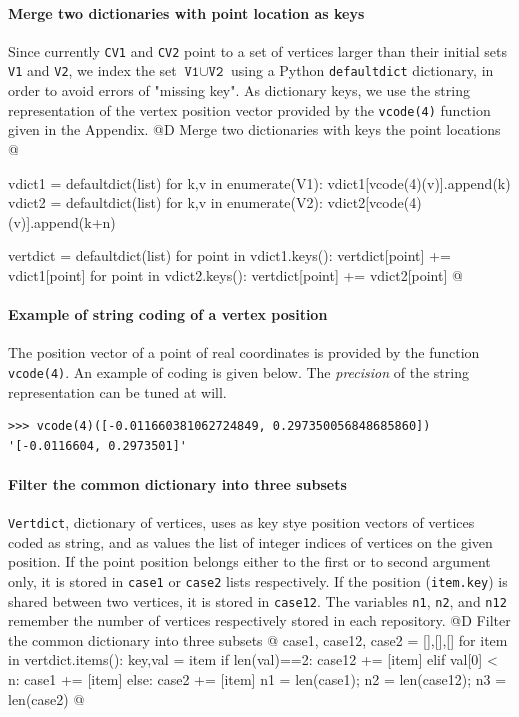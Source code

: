 \documentclass[11pt,oneside]{article}	%
\begin{document}
\paragraph{Merge two dictionaries with point location as keys}
Since currently \texttt{CV1} and \texttt{CV2} point to a set of vertices larger than their initial sets 
\texttt{V1} and \texttt{V2}, we index the set $\texttt{V1} \cup \texttt{V2}$ using a Python \texttt{defaultdict} dictionary, in order to avoid errors of "missing key". As dictionary keys, we use the string representation of the vertex position vector provided by the \texttt{vcode(4)} function given in the Appendix.
@D Merge two dictionaries with keys the point locations
@{
	vdict1 = defaultdict(list)
	for k,v in enumerate(V1): vdict1[vcode(4)(v)].append(k) 
	vdict2 = defaultdict(list)
	for k,v in enumerate(V2): vdict2[vcode(4)(v)].append(k+n) 
	
	vertdict = defaultdict(list)
	for point in vdict1.keys(): vertdict[point] += vdict1[point]
	for point in vdict2.keys(): vertdict[point] += vdict2[point]
@}

\paragraph{Example of string coding of a vertex position}
The position vector of a point of real coordinates is provided by the function \texttt{vcode(4)}.
An example of coding is given below. The \emph{precision} of the string representation can be tuned at will.
{\small
\begin{verbatim}
>>> vcode(4)([-0.011660381062724849, 0.297350056848685860])
'[-0.0116604, 0.2973501]'
\end{verbatim}}



\paragraph{Filter the common dictionary into three subsets}
\texttt{Vertdict}, dictionary of vertices, uses as key stye position vectors of vertices coded as string, and as values the list of integer indices of vertices on the given position. If the point position belongs either to the first or to second argument only, it is stored in \texttt{case1} or \texttt{case2} lists respectively. If the position (\texttt{item.key}) is shared between two vertices, it is stored in \texttt{case12}.
The variables \texttt{n1}, \texttt{n2}, and \texttt{n12} remember the number of vertices respectively stored in each repository.
@D Filter the common dictionary into three subsets
@{
	case1, case12, case2 = [],[],[]
	for item in vertdict.items():
		key,val = item
		if len(val)==2:  case12 += [item]
		elif val[0] < n: case1 += [item]
		else: case2 += [item]
	n1 = len(case1); n2 = len(case12); n3 = len(case2)
@}
\end{document}
